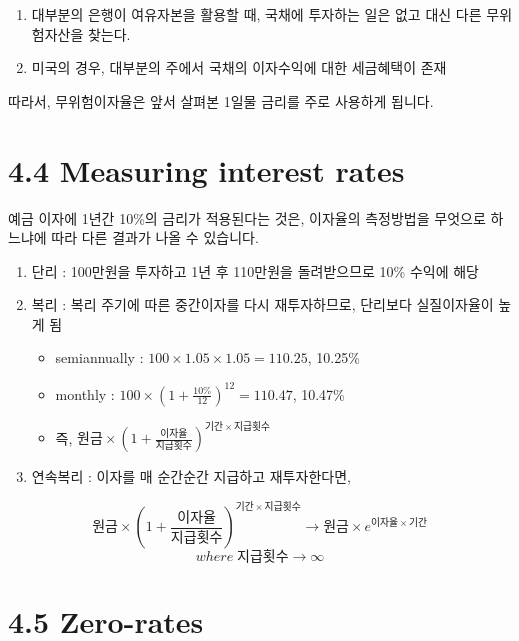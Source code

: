 \documentclass[
  letterpaper,
  DIV=11,
  numbers=noendperiod]{scrreprt}
\providecommand{\tightlist}{%
  \setlength{\itemsep}{0pt}\setlength{\parskip}{0pt}}\usepackage{longtable,booktabs,array}
\begin{document}
\begin{enumerate}
\def\labelenumi{\arabic{enumi}.}
\tightlist
\item
  대부분의 은행이 여유자본을 활용할 때, 국채에 투자하는 일은 없고 대신
  다른 무위험자산을 찾는다.
\item
  미국의 경우, 대부분의 주에서 국채의 이자수익에 대한 세금혜택이 존재
\end{enumerate}

따라서, 무위험이자율은 앞서 살펴본 1일물 금리를 주로 사용하게 됩니다.

\section*{4.4 Measuring interest rates}\label{measuring-interest-rates}


예금 이자에 1년간 10\%의 금리가 적용된다는 것은, 이자율의 측정방법을
무엇으로 하느냐에 따라 다른 결과가 나올 수 있습니다.

\begin{enumerate}
\def\labelenumi{\arabic{enumi}.}
\item
  단리 : 100만원을 투자하고 1년 후 110만원을 돌려받으므로 10\% 수익에
  해당
\item
  복리 : 복리 주기에 따른 중간이자를 다시 재투자하므로, 단리보다
  실질이자율이 높게 됨

  \begin{itemize}
  \tightlist
  \item
    semiannually : \(100\times 1.05\times 1.05=110.25\), 10.25\%
  \item
    monthly : \(100\times(1+\frac{10\%}{12})^{12}=110.47\), 10.47\%
  \item
    즉, \(원금\times(1+\frac{이자율}{지급횟수})^{기간\times 지급횟수}\)
  \end{itemize}
\item
  연속복리 : 이자를 매 순간순간 지급하고 재투자한다면,
\end{enumerate}

\[원금\times(1+\frac{이자율}{지급횟수})^{기간\times 지급횟수}\rightarrow 원금\times e^{이자율\times 기간}\]
\[where\;지급횟수\rightarrow \infty\]

\section*{4.5 Zero-rates}\label{zero-rates}
\end{document}
